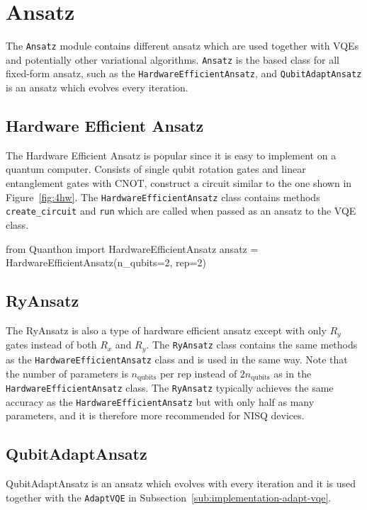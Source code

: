 \section{Ansatz}
\label{sec:ansatz}
The \texttt{Ansatz} module contains different ansatz which are used together with VQEs and potentially other variational algorithms. \texttt{Ansatz} is the based class for all fixed-form ansatz, such as the \texttt{HardwareEfficientAnsatz}, and \texttt{QubitAdaptAnsatz} is an ansatz which evolves every iteration.

\subsection{Hardware Efficient Ansatz}
\label{sub:hea}
The Hardware Efficient Ansatz is popular since it is easy to implement on a quantum computer. Consists of single qubit rotation gates and linear entanglement gates with CNOT, construct a circuit similar to the one shown in Figure~\ref{fig:4hw}. The \texttt{HardwareEfficientAnsatz} class contains methods \texttt{create\_circuit} and \texttt{run} which are called when passed as an ansatz to the VQE class.
\begin{mycode}
	from Quanthon import HardwareEfficientAnsatz
	ansatz = HardwareEfficientAnsatz(n_qubits=2, rep=2)
\end{mycode}

\subsection{RyAnsatz}
\label{sub:ryansatz}
The RyAnsatz is also a type of hardware efficient ansatz except with only $ R_y $ gates instead of both $ R_x $ and $ R_y $. The \texttt{RyAnsatz} class contains the same methods as the \texttt{HardwareEfficientAnsatz} class and is used in the same way. Note that the number of parameters is $ n_{\text{qubits}} $ per rep instead of $ 2n_{\text{qubits}} $ as in the \texttt{HardwareEfficientAnsatz} class. The \texttt{RyAnsatz} typically achieves the same accuracy as the \texttt{HardwareEfficientAnsatz} but with only half as many parameters, and it is therefore more recommended for NISQ devices.


\subsection{QubitAdaptAnsatz}
\label{sub:qubit-adapt-ansatz}
QubitAdaptAnsatz is an ansatz which evolves with every iteration and it is used together with the \texttt{AdaptVQE} in Subsection~\ref{sub:implementation-adapt-vqe}.

